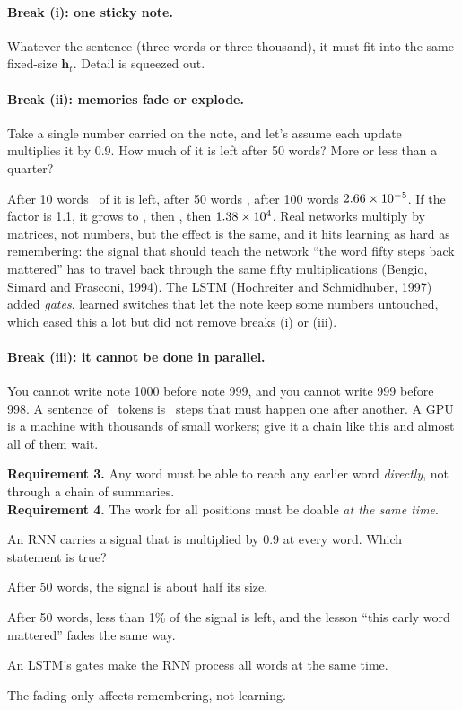 \paragraph{Break (i): one sticky note.} Whatever the sentence (three words or three thousand), it must fit into
the same fixed-size $\bm{h}_t$. Detail is squeezed out.

\paragraph{Break (ii): memories fade or explode.}
\Predict Take a single number carried on the note, and let's assume each update multiplies it by 0.9. How much
of it is left after 50 words? More or less than a quarter?

After 10 words \hFadeTen\ of it is left, after 50 words \hFadeFifty, after 100 words $2.66\times10^{-5}$. If the
factor is 1.1, it grows to \hGrowTen, then \hGrowFifty, then $1.38\times10^{4}$. Real networks multiply by
matrices, not numbers, but the effect is the same, and it hits learning as hard as remembering: the signal that
should teach the network ``the word fifty steps back mattered'' has to travel back through the same fifty
multiplications (Bengio, Simard and Frasconi, 1994). The LSTM (Hochreiter and Schmidhuber, 1997) added
\emph{gates}, learned switches that let the note keep some numbers untouched, which eased this a lot but did not
remove breaks (i) or (iii).

\paragraph{Break (iii): it cannot be done in parallel.} You cannot write note 1000 before note 999, and you
cannot write 999 before 998. A sentence of \hT\ tokens is \hT\ steps that must happen one after another. A GPU
is a machine with thousands of small workers; give it a chain like this and almost all of them wait.

\begin{sidebar}
\textbf{Requirement 3.} Any word must be able to reach any earlier word \emph{directly}, not through a chain of
summaries.\\
\textbf{Requirement 4.} The work for all positions must be doable \emph{at the same time}.
\end{sidebar}

\begin{checkq}
An RNN carries a signal that is multiplied by 0.9 at every word. Which statement is true?
\begin{options}
\item After 50 words, the signal is about half its size.
\item After 50 words, less than 1\% of the signal is left, and the lesson ``this early word mattered'' fades the same way.
\item An LSTM's gates make the RNN process all words at the same time.
\item The fading only affects remembering, not learning.
\end{options}
\end{checkq}

